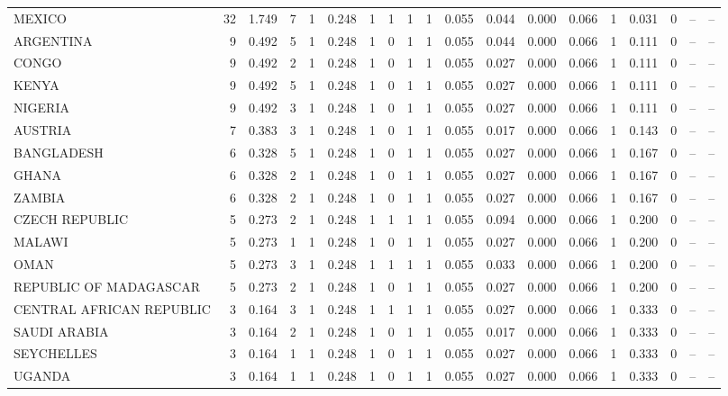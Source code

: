 \begin{tabular}{lrrrrrrrrrrrrrrrrrr}
MEXICO & 32 & 1.749 & 7 & 1 & 0.248 & 1 & 1 & 1 & 1 & 0.055 & 0.044 & 0.000 & 0.066 & 1 & 0.031 & 0 & -- & -- \\
ARGENTINA & 9 & 0.492 & 5 & 1 & 0.248 & 1 & 0 & 1 & 1 & 0.055 & 0.044 & 0.000 & 0.066 & 1 & 0.111 & 0 & -- & -- \\
CONGO & 9 & 0.492 & 2 & 1 & 0.248 & 1 & 0 & 1 & 1 & 0.055 & 0.027 & 0.000 & 0.066 & 1 & 0.111 & 0 & -- & -- \\
KENYA & 9 & 0.492 & 5 & 1 & 0.248 & 1 & 0 & 1 & 1 & 0.055 & 0.027 & 0.000 & 0.066 & 1 & 0.111 & 0 & -- & -- \\
NIGERIA & 9 & 0.492 & 3 & 1 & 0.248 & 1 & 0 & 1 & 1 & 0.055 & 0.027 & 0.000 & 0.066 & 1 & 0.111 & 0 & -- & -- \\
AUSTRIA & 7 & 0.383 & 3 & 1 & 0.248 & 1 & 0 & 1 & 1 & 0.055 & 0.017 & 0.000 & 0.066 & 1 & 0.143 & 0 & -- & -- \\
BANGLADESH & 6 & 0.328 & 5 & 1 & 0.248 & 1 & 0 & 1 & 1 & 0.055 & 0.027 & 0.000 & 0.066 & 1 & 0.167 & 0 & -- & -- \\
GHANA & 6 & 0.328 & 2 & 1 & 0.248 & 1 & 0 & 1 & 1 & 0.055 & 0.027 & 0.000 & 0.066 & 1 & 0.167 & 0 & -- & -- \\
ZAMBIA & 6 & 0.328 & 2 & 1 & 0.248 & 1 & 0 & 1 & 1 & 0.055 & 0.027 & 0.000 & 0.066 & 1 & 0.167 & 0 & -- & -- \\
CZECH REPUBLIC & 5 & 0.273 & 2 & 1 & 0.248 & 1 & 1 & 1 & 1 & 0.055 & 0.094 & 0.000 & 0.066 & 1 & 0.200 & 0 & -- & -- \\
MALAWI & 5 & 0.273 & 1 & 1 & 0.248 & 1 & 0 & 1 & 1 & 0.055 & 0.027 & 0.000 & 0.066 & 1 & 0.200 & 0 & -- & -- \\
OMAN & 5 & 0.273 & 3 & 1 & 0.248 & 1 & 1 & 1 & 1 & 0.055 & 0.033 & 0.000 & 0.066 & 1 & 0.200 & 0 & -- & -- \\
REPUBLIC OF MADAGASCAR & 5 & 0.273 & 2 & 1 & 0.248 & 1 & 0 & 1 & 1 & 0.055 & 0.027 & 0.000 & 0.066 & 1 & 0.200 & 0 & -- & -- \\
CENTRAL AFRICAN REPUBLIC & 3 & 0.164 & 3 & 1 & 0.248 & 1 & 1 & 1 & 1 & 0.055 & 0.027 & 0.000 & 0.066 & 1 & 0.333 & 0 & -- & -- \\
SAUDI ARABIA & 3 & 0.164 & 2 & 1 & 0.248 & 1 & 0 & 1 & 1 & 0.055 & 0.017 & 0.000 & 0.066 & 1 & 0.333 & 0 & -- & -- \\
SEYCHELLES & 3 & 0.164 & 1 & 1 & 0.248 & 1 & 0 & 1 & 1 & 0.055 & 0.027 & 0.000 & 0.066 & 1 & 0.333 & 0 & -- & -- \\
UGANDA & 3 & 0.164 & 1 & 1 & 0.248 & 1 & 0 & 1 & 1 & 0.055 & 0.027 & 0.000 & 0.066 & 1 & 0.333 & 0 & -- & -- \\

\end{tabular}
